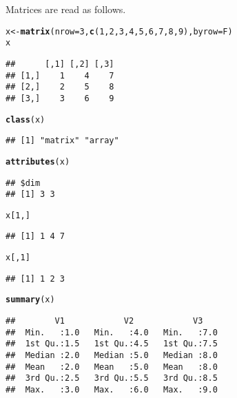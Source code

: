 \documentclass[12pt,A4,makeidx]{article}\usepackage[]{graphicx}\usepackage[]{xcolor}
\makeatletter
\newcommand{\hlnum}[1]{\textcolor[rgb]{0.686,0.059,0.569}{#1}}%
\newcommand{\hlstd}[1]{\textcolor[rgb]{0.345,0.345,0.345}{#1}}%
\newcommand{\hlkwb}[1]{\textcolor[rgb]{0.69,0.353,0.396}{#1}}%
\newcommand{\hlkwc}[1]{\textcolor[rgb]{0.333,0.667,0.333}{#1}}%
\newcommand{\hlkwd}[1]{\textcolor[rgb]{0.737,0.353,0.396}{\textbf{#1}}}%
\newenvironment{kframe}{%
 \def\at@end@of@kframe{}%
 \ifinner\ifhmode%
  \def\at@end@of@kframe{\end{minipage}}%
  \begin{minipage}{\columnwidth}%
 \fi\fi%
 \def\FrameCommand##1{\hskip\@totalleftmargin \hskip-\fboxsep
 \colorbox{shadecolor}{##1}\hskip-\fboxsep
     \hskip-\linewidth \hskip-\@totalleftmargin \hskip\columnwidth}%
 \MakeFramed {\advance\hsize-\width
   \@totalleftmargin\z@ \linewidth\hsize
   \@setminipage}}%
 {\par\unskip\endMakeFramed%
 \at@end@of@kframe}
\newenvironment{knitrout}{}{} %
\makeatother
\begin{document}
Matrices are read as follows.
\begin{knitrout}
\color{fgcolor}\begin{kframe}
\begin{alltt}
\hlstd{x}\hlkwb{<-}\hlkwd{matrix}\hlstd{(}\hlkwc{nrow}\hlstd{=}\hlnum{3}\hlstd{,}\hlkwd{c}\hlstd{(}\hlnum{1}\hlstd{,}\hlnum{2}\hlstd{,}\hlnum{3}\hlstd{,}\hlnum{4}\hlstd{,}\hlnum{5}\hlstd{,}\hlnum{6}\hlstd{,}\hlnum{7}\hlstd{,}\hlnum{8}\hlstd{,}\hlnum{9}\hlstd{),}\hlkwc{byrow}\hlstd{=F)}
\hlstd{x}
\end{alltt}
\begin{verbatim}
##      [,1] [,2] [,3]
## [1,]    1    4    7
## [2,]    2    5    8
## [3,]    3    6    9
\end{verbatim}
\begin{alltt}
\hlkwd{class}\hlstd{(x)}
\end{alltt}
\begin{verbatim}
## [1] "matrix" "array"
\end{verbatim}
\begin{alltt}
\hlkwd{attributes}\hlstd{(x)}
\end{alltt}
\begin{verbatim}
## $dim
## [1] 3 3
\end{verbatim}
\begin{alltt}
\hlstd{x[}\hlnum{1}\hlstd{,]}
\end{alltt}
\begin{verbatim}
## [1] 1 4 7
\end{verbatim}
\begin{alltt}
\hlstd{x[,}\hlnum{1}\hlstd{]}
\end{alltt}
\begin{verbatim}
## [1] 1 2 3
\end{verbatim}
\begin{alltt}
\hlkwd{summary}\hlstd{(x)}
\end{alltt}
\begin{verbatim}
##        V1            V2            V3     
##  Min.   :1.0   Min.   :4.0   Min.   :7.0  
##  1st Qu.:1.5   1st Qu.:4.5   1st Qu.:7.5  
##  Median :2.0   Median :5.0   Median :8.0  
##  Mean   :2.0   Mean   :5.0   Mean   :8.0  
##  3rd Qu.:2.5   3rd Qu.:5.5   3rd Qu.:8.5  
##  Max.   :3.0   Max.   :6.0   Max.   :9.0
\end{verbatim}
\end{kframe}
\end{knitrout}
\end{document}
